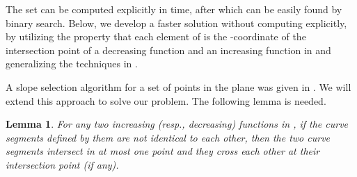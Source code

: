 \documentclass[11pt]{article}
\newtheorem{Lem}{Lemma}
\begin{document}
The set  can be computed explicitly in  time, after
which  can be easily found by binary search. Below, we develop a faster
solution without computing  explicitly, by utilizing
the property that each element of  is the -coordinate of the
intersection point of a decreasing function and an increasing function in
 and generalizing the techniques in \cite{ref:ColeAn89}.

A slope selection algorithm for a set of points in the plane was given in
\cite{ref:ColeAn89}. We will extend this approach to solve our problem.
The following lemma is needed.

\begin{Lem}\label{lem:30}
For any two increasing (resp., decreasing) functions in , if the
curve segments defined by them are not identical to each other, then the two curve
segments intersect in at most one point and they cross each other at
their intersection point (if any).
\end{Lem}
\end{document}
